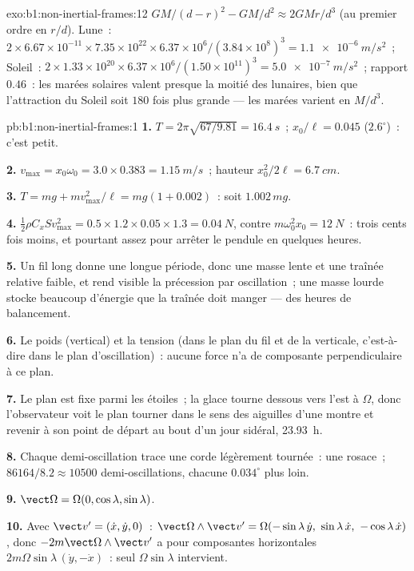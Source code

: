\begin{solution}{exo:b1:non-inertial-frames:12}
$GM/(d - r)^2 - GM/d^2 \approx 2GMr/d^3$ (au premier ordre en $r/d$). Lune~:
$2 \times 6.67\times10^{-11} \times 7.35\times10^{22} \times 6.37\times10^6/
(3.84\times10^8)^3 = \qty{1.1e-6}{m/s^2}$~; Soleil~: $2 \times 1.33\times10^{20}
\times 6.37\times10^6/(1.50\times10^{11})^3 = \qty{5.0e-7}{m/s^2}$~; rapport
$0.46$~: les marées solaires valent presque la moitié des lunaires, bien
que l'attraction du Soleil soit $180$ fois plus grande --- les marées
varient en $M/d^3$.
\end{solution}

\begin{solution}{pb:b1:non-inertial-frames:1}
\textbf{1.} $T = 2\pi\sqrt{67/9.81} = \qty{16.4}{s}$~; $x_0/\ell = 0.045$
($2.6^\circ$)~: c'est petit.

\textbf{2.} $v_{\max} = x_0\omega_0 = 3.0 \times 0.383 = \qty{1.15}{m/s}$~; hauteur
$x_0^2/2\ell = \qty{6.7}{cm}$.

\textbf{3.} $T = mg + mv_{\max}^2/\ell = mg(1 + 0.002)$~: soit $1.002\,mg$.

\textbf{4.} $\tfrac12\rho C_xSv_{\max}^2 = 0.5 \times 1.2 \times 0.05 \times 1.3 =
\qty{0.04}{N}$, contre $m\omega_0^2x_0 = \qty{12}{N}$~: trois cents fois
moins, et pourtant assez pour arrêter le pendule en quelques heures.

\textbf{5.} Un fil long donne une longue période, donc une masse lente et
une traînée relative faible, et rend visible la précession par
oscillation~; une masse lourde stocke beaucoup d'énergie que la traînée
doit manger --- des heures de balancement.

\textbf{6.} Le poids (vertical) et la tension (dans le plan du fil et de
la verticale, c'est-à-dire dans le plan d'oscillation)~: aucune force n'a
de composante perpendiculaire à ce plan.

\textbf{7.} Le plan est fixe parmi les étoiles~; la glace tourne dessous
vers l'est à $\Omega$, donc l'observateur voit le plan tourner dans le
sens des aiguilles d'une montre et revenir à son point de départ au bout
d'un jour sidéral, \qty{23.93}{h}.

\textbf{8.} Chaque demi-oscillation trace une corde légèrement tournée~:
une rosace~; $86164/8.2 \approx 10500$ demi-oscillations, chacune
$0.034^\circ$ plus loin.

\textbf{9.} $\vect\Omega = \Omega(0, \cos\lambda, \sin\lambda)$.

\textbf{10.} Avec $\vect v' = (\dot x, \dot y, 0)$~:
$\vect\Omega\wedge\vect v' = \Omega(-\sin\lambda\,\dot y,\ \sin\lambda\,\dot x,\ -\cos\lambda\,\dot x)$,
donc $-2m\vect\Omega\wedge\vect v'$ a pour composantes horizontales
$2m\Omega\sin\lambda\,(\dot y, -\dot x)$~: seul $\Omega\sin\lambda$ intervient.


\end{solution}
